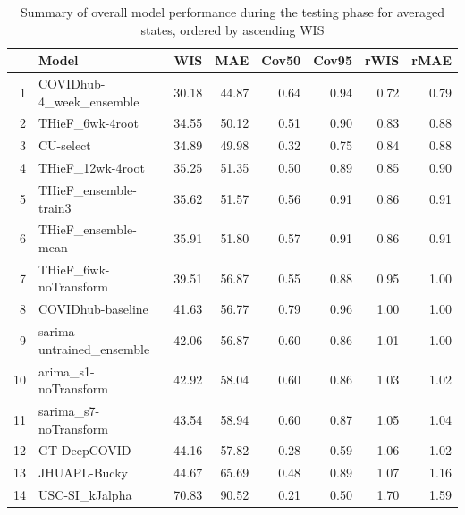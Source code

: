 \documentclass[12pt]{article}
\begin{document}
\begin{table}%
\begin{center}
\caption{Summary of overall model performance during the testing phase for averaged states, ordered by ascending WIS}
\label{tab:table_overall_states}
\begin{tabular}{rlrrrrrr}
  \hline
 & Model & WIS & MAE & Cov50 & Cov95 & rWIS & rMAE \\ 
  \hline
1 & COVIDhub-4\_week\_ensemble & 30.18 & 44.87 & 0.64 & 0.94 & 0.72 & 0.79 \\ 
  2 & THieF\_6wk-4root & 34.55 & 50.12 & 0.51 & 0.90 & 0.83 & 0.88 \\ 
  3 & CU-select & 34.89 & 49.98 & 0.32 & 0.75 & 0.84 & 0.88 \\ 
  4 & THieF\_12wk-4root & 35.25 & 51.35 & 0.50 & 0.89 & 0.85 & 0.90 \\ 
  5 & THieF\_ensemble-train3 & 35.62 & 51.57 & 0.56 & 0.91 & 0.86 & 0.91 \\ 
  6 & THieF\_ensemble-mean & 35.91 & 51.80 & 0.57 & 0.91 & 0.86 & 0.91 \\ 
  7 & THieF\_6wk-noTransform & 39.51 & 56.87 & 0.55 & 0.88 & 0.95 & 1.00 \\ 
  8 & COVIDhub-baseline & 41.63 & 56.77 & 0.79 & 0.96 & 1.00 & 1.00 \\ 
  9 & sarima-untrained\_ensemble & 42.06 & 56.87 & 0.60 & 0.86 & 1.01 & 1.00 \\ 
  10 & arima\_s1-noTransform & 42.92 & 58.04 & 0.60 & 0.86 & 1.03 & 1.02 \\ 
  11 & sarima\_s7-noTransform & 43.54 & 58.94 & 0.60 & 0.87 & 1.05 & 1.04 \\ 
  12 & GT-DeepCOVID & 44.16 & 57.82 & 0.28 & 0.59 & 1.06 & 1.02 \\ 
  13 & JHUAPL-Bucky & 44.67 & 65.69 & 0.48 & 0.89 & 1.07 & 1.16 \\ 
  14 & USC-SI\_kJalpha & 70.83 & 90.52 & 0.21 & 0.50 & 1.70 & 1.59 \\ 
   \hline
\end{tabular}\end{center}
\end{table}
\end{document}
